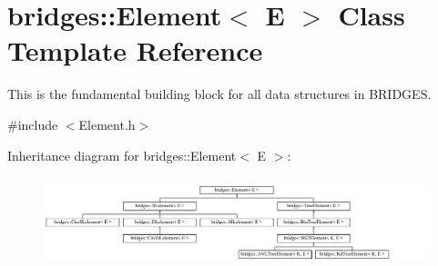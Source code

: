 \hypertarget{classbridges_1_1_element}{}\section{bridges\+:\+:Element$<$ E $>$ Class Template Reference}
\label{classbridges_1_1_element}


This is the fundamental building block for all data structures in B\+R\+I\+D\+G\+ES.  




{\ttfamily \#include $<$Element.\+h$>$}

Inheritance diagram for bridges\+:\+:Element$<$ E $>$\+:\begin{figure}[H]
\begin{center}
\leavevmode
\includegraphics[height=2.641510cm]{classbridges_1_1_element}
\end{center}
\end{figure}
